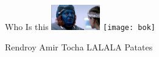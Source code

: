 \documentclass{exam}
\begin{document}
\begin{questions}
\question Who Is this\newline
\includegraphics[height=3em]{rendroy2.jpg} \newline
\texttt{[image: bok]} \newline
\begin{oneparchoices}
\choice Rendroy
\choice Amir Tocha
\choice LALALA
\choice Patates
\end{oneparchoices}
\end{questions}
\end{document}
